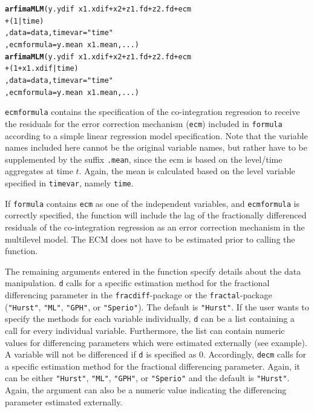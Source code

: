 \documentclass[12pt]{paper}\usepackage[]{graphicx}\usepackage[]{color}
\makeatletter
\newcommand{\hlnum}[1]{\textcolor[rgb]{0.686,0.059,0.569}{#1}}%
\newcommand{\hlstr}[1]{\textcolor[rgb]{0.192,0.494,0.8}{#1}}%
\newcommand{\hlopt}[1]{\textcolor[rgb]{0,0,0}{#1}}%
\newcommand{\hlstd}[1]{\textcolor[rgb]{0.345,0.345,0.345}{#1}}%
\newcommand{\hlkwc}[1]{\textcolor[rgb]{0.333,0.667,0.333}{#1}}%
\newcommand{\hlkwd}[1]{\textcolor[rgb]{0.737,0.353,0.396}{\textbf{#1}}}%
\newenvironment{kframe}{%
 \def\at@end@of@kframe{}%
 \ifinner\ifhmode%
  \def\at@end@of@kframe{\end{minipage}}%
  \begin{minipage}{\columnwidth}%
 \fi\fi%
 \def\FrameCommand##1{\hskip\@totalleftmargin \hskip-\fboxsep
 \colorbox{shadecolor}{##1}\hskip-\fboxsep
     \hskip-\linewidth \hskip-\@totalleftmargin \hskip\columnwidth}%
 \MakeFramed {\advance\hsize-\width
   \@totalleftmargin\z@ \linewidth\hsize
   \@setminipage}}%
 {\par\unskip\endMakeFramed%
 \at@end@of@kframe}
\newenvironment{knitrout}{}{} %
\makeatother
\begin{document}
\begin{knitrout}
\color{fgcolor}\begin{kframe}
\begin{alltt}
\hlkwd{arfimaMLM}\hlstd{(y.ydif} \hlopt{~} \hlstd{x1.xdif} \hlopt{+} \hlstd{x2} \hlopt{+} \hlstd{z1.fd} \hlopt{+} \hlstd{z2.fd} \hlopt{+} \hlstd{ecm}
          \hlopt{+} \hlstd{(}\hlnum{1}\hlopt{|}\hlstd{time)}
          \hlstd{,} \hlkwc{data}\hlstd{=data,} \hlkwc{timevar} \hlstd{=} \hlstr{"time"}
          \hlstd{,} \hlkwc{ecmformula} \hlstd{= y.mean} \hlopt{~} \hlstd{x1.mean, ...)}
\hlkwd{arfimaMLM}\hlstd{(y.ydif} \hlopt{~} \hlstd{x1.xdif} \hlopt{+} \hlstd{x2} \hlopt{+} \hlstd{z1.fd} \hlopt{+} \hlstd{z2.fd} \hlopt{+} \hlstd{ecm}
          \hlopt{+} \hlstd{(}\hlnum{1}\hlopt{+}\hlstd{x1.xdif}\hlopt{|}\hlstd{time)}
          \hlstd{,} \hlkwc{data}\hlstd{=data,} \hlkwc{timevar} \hlstd{=} \hlstr{"time"}
          \hlstd{,} \hlkwc{ecmformula} \hlstd{= y.mean} \hlopt{~} \hlstd{x1.mean, ...)}
\end{alltt}
\end{kframe}
\end{knitrout}

\texttt{ecmformula} contains the specification of the co-integration regression to receive the residuals for the error correction mechanism (\texttt{ecm}) included in \texttt{formula} according to a simple linear regression model specification. Note that the variable names included here cannot be the original variable names, but rather have to be supplemented by the suffix \texttt{.mean}, since the ecm is based on the level/time aggregates at time $t$. Again, the mean is calculated based on the level variable specified in \texttt{timevar}, namely \texttt{time}.

If \texttt{formula} contains \texttt{ecm} as one of the independent variables, and \texttt{ecmformula} is correctly specified, the function will include the lag of the fractionally differenced residuals of the co-integration regression as an error correction mechanism in the multilevel model. The ECM does not have to be estimated prior to calling the function.

The remaining arguments entered in the function specify details about the data manipulation. \texttt{d} calls for a specific estimation method for the fractional differencing parameter in the \texttt{fracdiff}-package or the \texttt{fractal}-package (\texttt{"Hurst"}, \texttt{"ML"}, \texttt{"GPH"}, or \texttt{"Sperio"}). The default is \texttt{"Hurst"}. If the user wants to specify the methods for each variable individually, \texttt{d} can be a list containing a call for every individual variable. Furthermore, the list can contain numeric values for differencing parameters which were estimated externally (see example). A variable will not be differenced if \texttt{d} is specified as 0. Accordingly, \texttt{decm} calls for a specific estimation method for the fractional differencing parameter. Again, it can be either \texttt{"Hurst"}, \texttt{"ML"}, \texttt{"GPH"}, or \texttt{"Sperio"} and the default is \texttt{"Hurst"}. Again, the argument can also be a numeric value indicating the differencing parameter estimated externally.
\end{document}
